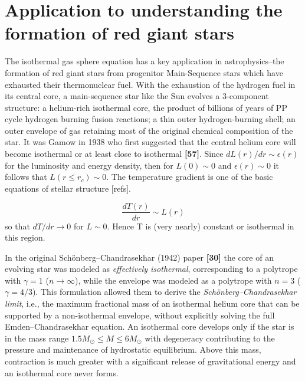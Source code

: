 \documentclass[12pt,a4paper]{article}
\numberwithin{equation}{section}
\begin{document}
\section{Application to understanding the formation of red giant stars}
The isothermal gas sphere equation has a key application in astrophysics--the formation of red giant stars from progenitor Main-Sequence stars which have exhausted their thermonuclear fuel. With the exhaustion of the hydrogen fuel in its central core, a main-sequence star like the Sun evolves a 3-component structure: a helium-rich isothermal core, the product of billions of years of PP cycle hydrogen burning fusion reactions; a thin outer hydrogen-burning shell; an outer envelope of gas retaining most of the original chemical composition of the star. It was Gamow in 1938 who first suggested that the central helium core will become isothermal or at least close to isothermal \textbf{[57]}. Since $dL(r)/dr \sim \epsilon(r)$ for the luminosity and energy density, then for $L(0)\sim 0$ and $ \epsilon(r)\sim 0$ it follows that $L(r\le r_{c})\sim 0$. The temperature gradient is one of the basic equations of stellar structure [refs].

\begin{equation}
\frac{dT(r)}{dr}\sim L(r)
\end{equation}
so that $dT/dr\to 0$ for $L\sim 0$. Hence T is (very nearly) constant or isothermal in this region.

In the original Schönberg--Chandrasekhar (1942) paper \textbf{[30]} the core of an evolving star was modeled as \emph{effectively isothermal}, corresponding to a polytrope with $\gamma=1$ ($n\to\infty$), while the envelope was modeled as a polytrope with $n=3$ ($\gamma=4/3$). This formulation allowed them to derive the \emph{Schönberg--Chandrasekhar limit}, i.e., the maximum fractional mass of an isothermal helium core that can be supported by a non-isothermal envelope, without explicitly solving the full Emden--Chandrasekhar equation. An isothermal core develops only if the star is in the mass range $1.5M_{\odot}\le M\le 6 M_{\odot}$ with degeneracy contributing to the pressure and maintenance of hydrostatic equilibrium. Above this mass, contraction is much greater with a significant release of gravitational energy and an isothermal core never forms.
\end{document}
